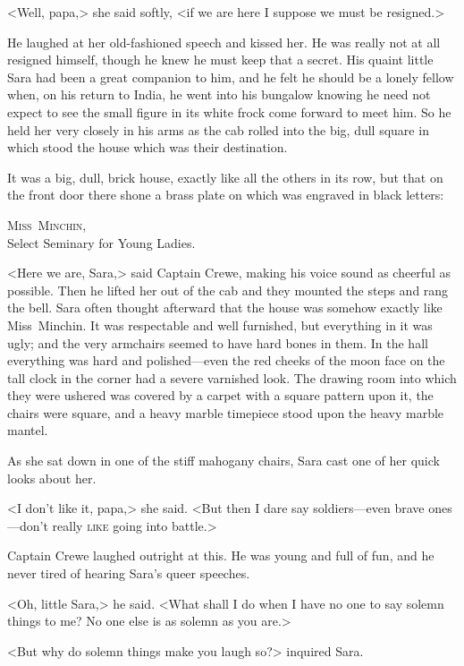 <Well, papa,> she said softly, <if we are here I suppose we must be resigned.>

He laughed at her old-fashioned speech and kissed her. He was really not at all resigned himself, though he knew he must keep that a secret. His quaint little Sara had been a great companion to him, and he felt he should be a lonely fellow when, on his return to India, he went into his bungalow knowing he need not expect to see the small figure in its white frock come forward to meet him. So he held her very closely in his arms as the cab rolled into the big, dull square in which stood the house which was their destination.

It was a big, dull, brick house, exactly like all the others in its row, but that on the front door there shone a brass plate on which was engraved in black letters:

\begin{center}
\textsc{Miss~Minchin},\\
Select Seminary for Young Ladies.
\end{center}

<Here we are, Sara,> said Captain Crewe, making his voice sound as cheerful as possible. Then he lifted her out of the cab and they mounted the steps and rang the bell. Sara often thought afterward that the house was somehow exactly like Miss~Minchin. It was respectable and well furnished, but everything in it was ugly; and the very armchairs seemed to have hard bones in them. In the hall everything was hard and polished—even the red cheeks of the moon face on the tall clock in the corner had a severe varnished look. The drawing room into which they were ushered was covered by a carpet with a square pattern upon it, the chairs were square, and a heavy marble timepiece stood upon the heavy marble mantel.

As she sat down in one of the stiff mahogany chairs, Sara cast one of her quick looks about her.

<I don't like it, papa,> she said. <But then I dare say soldiers—even brave ones—don't really \textsc{like} going into battle.>

Captain Crewe laughed outright at this. He was young and full of fun, and he never tired of hearing Sara's queer speeches.

<Oh, little Sara,> he said. <What shall I do when I have no one to say solemn things to me? No one else is as solemn as you are.>

<But why do solemn things make you laugh so?> inquired Sara.

